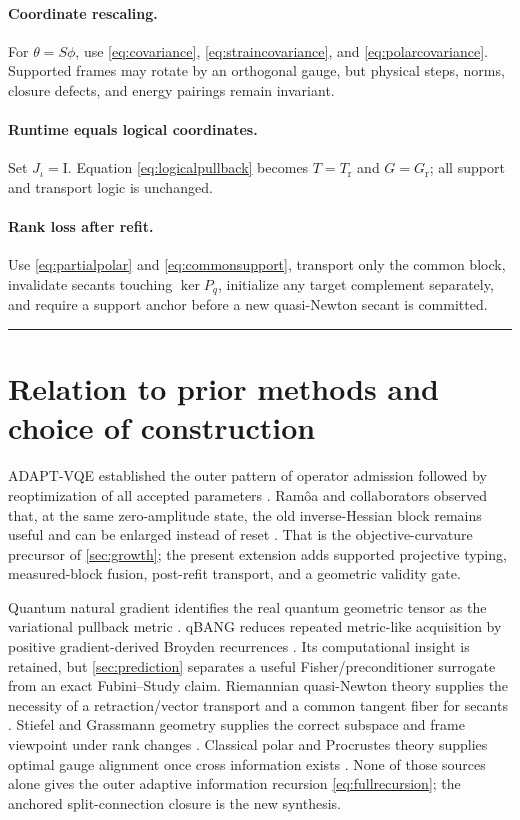 \documentclass[10pt,twocolumn]{article}
\newcommand{\cref}[1]{\autoref{#1}}
\theoremstyle{definition}
\theoremstyle{remark}
\newcommand{\conceptbreak}{\par\vspace{0.45em}\noindent\textcolor{navy!55}{\rule{\columnwidth}{0.35pt}}\vspace{0.35em}\par}
\newcommand{\Id}{\mathrm I}
\newcommand{\rt}{\mathrm r}
\begin{document}
\paragraph{Coordinate rescaling.}
For $\theta=S\phi$, use \eqref{eq:covariance}, \eqref{eq:straincovariance}, and \eqref{eq:polarcovariance}.  Supported frames may rotate by an orthogonal gauge, but physical steps, norms, closure defects, and energy pairings remain invariant.

\paragraph{Runtime equals logical coordinates.}
Set $J_\iota=\Id$.  Equation \eqref{eq:logicalpullback} becomes $T=T_{\rt}$ and $G=G_{\rt}$; all support and transport logic is unchanged.

\paragraph{Rank loss after refit.}
Use \eqref{eq:partialpolar} and \eqref{eq:commonsupport}, transport only the common block, invalidate secants touching $\ker P_q$, initialize any target complement separately, and require a support anchor before a new quasi-Newton secant is committed.

\conceptbreak

\section{Relation to prior methods and choice of construction}
\label{sec:literature}

ADAPT-VQE established the outer pattern of operator admission followed by reoptimization of all accepted parameters \cite{Grimsley2019}.  Ram\^oa and collaborators observed that, at the same zero-amplitude state, the old inverse-Hessian block remains useful and can be enlarged instead of reset \cite{Ramoa2025}.  That is the objective-curvature precursor of \cref{sec:growth}; the present extension adds supported projective typing, measured-block fusion, post-refit transport, and a geometric validity gate.

Quantum natural gradient identifies the real quantum geometric tensor as the variational pullback metric \cite{Stokes2020}.  qBANG reduces repeated metric-like acquisition by positive gradient-derived Broyden recurrences \cite{Fitzek2024}.  Its computational insight is retained, but \cref{sec:prediction} separates a useful Fisher/preconditioner surrogate from an exact Fubini--Study claim.  Riemannian quasi-Newton theory supplies the necessity of a retraction/vector transport and a common tangent fiber for secants \cite{Absil2008,Huang2015,Huang2018}.  Stiefel and Grassmann geometry supplies the correct subspace and frame viewpoint under rank changes \cite{Edelman1998}.  Classical polar and Procrustes theory supplies optimal gauge alignment once cross information exists \cite{Schonemann1966,Higham1986}.  None of those sources alone gives the outer adaptive information recursion \eqref{eq:fullrecursion}; the anchored split-connection closure is the new synthesis.
\end{document}

